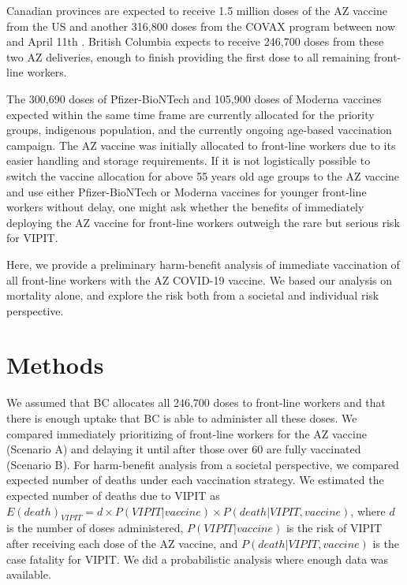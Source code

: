 \documentclass[]{interact}
\theoremstyle{plain}%
\theoremstyle{definition}
\theoremstyle{remark}
\begin{document}
Canadian provinces are expected to receive 1.5 million doses of the AZ
vaccine from the US and another 316,800 doses from the COVAX program
between now and April 11th \citep{government_of_canada_vaccines_2021}.
British Columbia expects to receive 246,700 doses from these two AZ
deliveries, enough to finish providing the first dose to all remaining
front-line workers.

The 300,690 doses of Pfizer-BioNTech and 105,900 doses of Moderna
vaccines expected within the same time frame are currently allocated for
the priority groups, indigenous population, and the currently ongoing
age-based vaccination campaign. The AZ vaccine was initially allocated
to front-line workers due to its easier handling and storage
requirements. If it is not logistically possible to switch the vaccine
allocation for above 55 years old age groups to the AZ vaccine and use
either Pfizer-BioNTech or Moderna vaccines for younger front-line
workers without delay, one might ask whether the benefits of immediately
deploying the AZ vaccine for front-line workers outweigh the rare but
serious risk for VIPIT.

Here, we provide a preliminary harm-benefit analysis of immediate
vaccination of all front-line workers with the AZ COVID-19 vaccine. We
based our analysis on mortality alone, and explore the risk both from a
societal and individual risk perspective.

\hypertarget{methods}{%
\section{Methods}\label{methods}}

We assumed that BC allocates all 246,700 doses to front-line workers and
that there is enough uptake that BC is able to administer all these
doses. We compared immediately prioritizing of front-line workers for
the AZ vaccine (Scenario A) and delaying it until after those over 60
are fully vaccinated (Scenario B). For harm-benefit analysis from a
societal perspective, we compared expected number of deaths under each
vaccination strategy. We estimated the expected number of deaths due to
VIPIT as
\(E(death)_{VIPIT} = d \times P(VIPIT|vaccine) \times P(death|VIPIT, vaccine)\),
where \(d\) is the number of doses administered, \(P(VIPIT|vaccine)\) is
the risk of VIPIT after receiving each dose of the AZ vaccine, and
\(P(death|VIPIT, vaccine)\) is the case fatality for VIPIT. We did a
probabilistic analysis where enough data was available.
\end{document}
